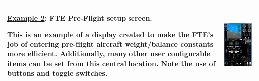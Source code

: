 \documentclass[
]{book}
\begin{document}
\begin{longtable}[]{@{}ll@{}}
\toprule
\endhead
\begin{minipage}[t]{0.46\columnwidth}\raggedright
\underline{Example 2}: FTE
Pre-Flight setup screen.

This is an example of a display
created to make the FTE's job of
entering pre-flight aircraft
weight/balance constants more
efficient. Additionally, many other
user configurable items can be set
from this central location. Note the
use of buttons and toggle switches.\strut
\end{minipage} & \begin{minipage}[t]{0.48\columnwidth}\raggedright
\includegraphics{media/21/basic-fte-sa.png}\strut
\end{minipage}\tabularnewline
\bottomrule
\end{longtable}
\end{document}
